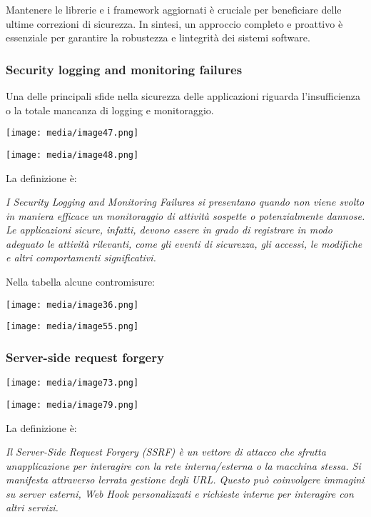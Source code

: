 Mantenere le librerie e i framework aggiornati è cruciale per
beneficiare delle ultime correzioni di sicurezza. In sintesi, un
approccio completo e proattivo è essenziale per garantire la robustezza
e l\textquotesingle integrità dei sistemi software.

\subsubsection{Security logging and monitoring
failures}\label{security-logging-and-monitoring-failures}

Una delle principali sfide nella sicurezza delle applicazioni riguarda
l'insufficienza o la totale mancanza di logging e monitoraggio.

\texttt{[image: media/image47.png]}

\texttt{[image: media/image48.png]}

La definizione è:

\emph{I Security Logging and Monitoring Failures si presentano quando
non viene svolto in maniera efficace un monitoraggio di attività
sospette o potenzialmente dannose. Le applicazioni sicure, infatti,
devono essere in grado di registrare in modo adeguato le attività
rilevanti, come gli eventi di sicurezza, gli accessi, le modifiche e
altri comportamenti significativi.}

Nella tabella alcune contromisure:

\texttt{[image: media/image36.png]}

\texttt{[image: media/image55.png]}

\subsubsection{Server-side request
forgery}\label{server-side-request-forgery}

\texttt{[image: media/image73.png]}

\texttt{[image: media/image79.png]}

La definizione è:

\emph{Il Server-Side Request Forgery (SSRF) è un vettore di attacco che
sfrutta un\textquotesingle applicazione per interagire con la rete
interna/esterna o la macchina stessa. Si manifesta attraverso
l\textquotesingle errata gestione degli URL. Questo può coinvolgere
immagini su server esterni, Web Hook personalizzati e richieste interne
per interagire con altri servizi.}

